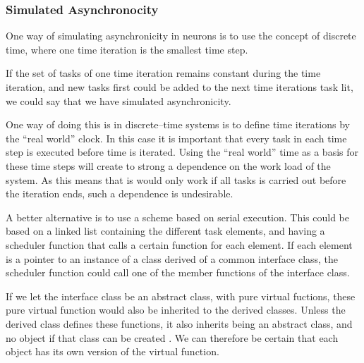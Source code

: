 	
	 	\subsubsection{Simulated Asynchronocity}
	One way of simulating asynchronicity in neurons is to use the concept of discrete time, where one time iteration is the smallest time step.

	If the set of tasks of one time iteration remains constant during the time iteration, and new tasks first could be added to the next time iterations task lit, we could say that we have simulated asynchronicity.


	One way of doing this is in discrete--time systems is to define time iterations by the ``real world'' clock.
	In this case it is important that every task in each time step is executed before time is iterated.
	Using the ``real world'' time as a basis for these time steps will create to strong a dependence on the work load of the system.
	As this means that is would only work if all tasks is carried out before the iteration ends, such a dependence is undesirable. %

	A better alternative is to use a scheme based on serial execution. %
	This could be based on a linked list containing the different task elements, and having a scheduler function that calls a certain function for each element.
	If each element is a pointer to an instance of a class derived of a common interface class, the scheduler function could call one of the member functions of the interface class.

	If we let the interface class be an abstract class, with pure virtual fuctions, these pure virtual function would also be inherited to the derived classes.
	Unless the derived class defines these functions, it also inherits being an abstract class, and no object if that class can be created \cite{Stroustrup2000KAP12}.
	We can therefore be certain that each object has its own version of the virtual function.

